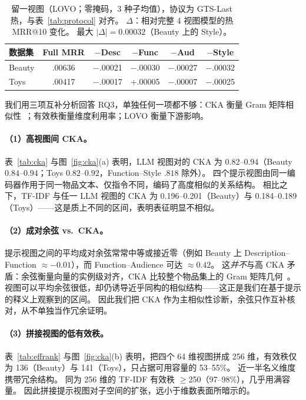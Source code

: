 \documentclass[sigconf,natbib=true,anonymous]{acmart}
\begin{document}
\begin{table}[t]
\centering
\caption{%
留一视图（LOVO；零掩码，3 种子均值），协议为 GTS-Last 热，与表~\ref{tab:protocol} 对齐。
$\Delta$：相对完整 4 视图模型的热 MRR@10 变化。
最大 $|\Delta|{=}0.00032$（Beauty 上的 Style）。%
}
\label{tab:lovo}
\small
\setlength{\tabcolsep}{3.5pt}
\begin{tabular}{@{}lccccc@{}}
\toprule
数据集 & Full MRR & $-$Desc & $-$Func & $-$Aud & $-$Style \\
\midrule
Beauty & .00636 & $-$.00021 & $-$.00030 & $-$.00027 & $-$.00032 \\
Toys   & .00417 & $-$.00017 & $+$.00005 & $-$.00007 & $-$.00025 \\
\bottomrule
\end{tabular}
\end{table}

我们用三项互补分析回答 RQ3，单独任何一项都不够：CKA 衡量 Gram 矩阵相似性~\cite{kornblith2019cka}；有效秩衡量维度利用率；LOVO 衡量下游影响。

\paragraph{（1）高视图间 CKA。}
表~\ref{tab:cka} 与图~\ref{fig:cka}(a) 表明，LLM 视图对的 CKA 为 $0.82$--$0.94$（Beauty $0.84$--$0.94$；Toys $0.82$--$0.92$，Function--Style $.818$ 除外）。
四个提示视图由同一编码器作用于同一物品文本、仅指令不同，编码了高度相似的关系结构。
相比之下，TF-IDF 与任一 LLM 视图的 CKA 为 0.196--0.201（Beauty）与 0.184--0.189（Toys）——这是质上不同的区间，表明表征明显不相似。

\paragraph{（2）成对余弦 vs.\ CKA。}
提示视图之间的平均成对余弦常常中等或接近零（例如 Beauty 上 Description--Function $\approx -0.01$），而 Function--Audience 可达 $\approx 0.42$。
这\emph{并不}与高 CKA 矛盾：余弦衡量向量的实例级对齐，CKA 比较整个物品集上的 Gram 矩阵几何~\cite{kornblith2019cka}。
视图可以平均余弦很低，却仍诱导近乎同构的相似结构——这正是我们在基于提示的释义上观察到的区间。
因此我们把 CKA 作为主相似性诊断，余弦只作互补核对，从不单独当作冗余证明。

\paragraph{（3）拼接视图的低有效秩。}
表~\ref{tab:effrank} 与图~\ref{fig:cka}(b) 表明，把四个 64 维视图拼成 256 维，有效秩仅为 136（Beauty）与 141（Toys），只占据可用容量的 53--55\%。
近一半名义维度携带冗余结构。
同为 256 维的 TF-IDF 有效秩 $\ge$250（97--98\%），几乎用满容量。
因此拼接提示视图对子空间的扩张，远小于维数表面所暗示的。
\end{document}
